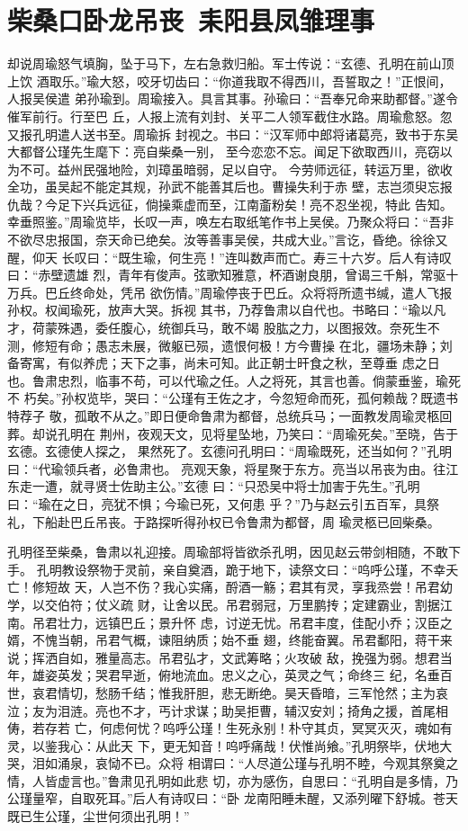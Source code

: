 \chapter{柴桑口卧龙吊丧~耒阳县凤雏理事}

却说周瑜怒气填胸，坠于马下，左右急救归船。军士传说：“玄德、孔明在前山顶上饮
酒取乐。”瑜大怒，咬牙切齿曰：“你道我取不得西川，吾誓取之！”正恨间，人报吴侯遣
弟孙瑜到。周瑜接入。具言其事。孙瑜曰：“吾奉兄命来助都督。”遂令催军前行。行至巴
丘，人报上流有刘封、关平二人领军截住水路。周瑜愈怒。忽又报孔明遣人送书至。周瑜拆
封视之。书曰：“汉军师中郎将诸葛亮，致书于东吴大都督公瑾先生麾下：亮自柴桑一别，
至今恋恋不忘。闻足下欲取西川，亮窃以为不可。益州民强地险，刘璋虽暗弱，足以自守。
今劳师远征，转运万里，欲收全功，虽吴起不能定其规，孙武不能善其后也。曹操失利于赤
壁，志岂须臾忘报仇哉？今足下兴兵远征，倘操乘虚而至，江南齑粉矣！亮不忍坐视，特此
告知。幸垂照鉴。”周瑜览毕，长叹一声，唤左右取纸笔作书上吴侯。乃聚众将曰：“吾非
不欲尽忠报国，奈天命已绝矣。汝等善事吴侯，共成大业。”言讫，昏绝。徐徐又醒，仰天
长叹曰：“既生瑜，何生亮！”连叫数声而亡。寿三十六岁。后人有诗叹曰：“赤壁遗雄
烈，青年有俊声。弦歌知雅意，杯酒谢良朋，曾谒三千斛，常驱十万兵。巴丘终命处，凭吊
欲伤情。”周瑜停丧于巴丘。众将将所遗书缄，遣人飞报孙权。权闻瑜死，放声大哭。拆视
其书，乃荐鲁肃以自代也。书略曰：“瑜以凡才，荷蒙殊遇，委任腹心，统御兵马，敢不竭
股肱之力，以图报效。奈死生不测，修短有命；愚志未展，微躯已殒，遗恨何极！方今曹操
在北，疆场未静；刘备寄寓，有似养虎；天下之事，尚未可知。此正朝士旰食之秋，至尊垂
虑之日也。鲁肃忠烈，临事不苟，可以代瑜之任。人之将死，其言也善。倘蒙垂鉴，瑜死不
朽矣。”孙权览毕，哭曰：“公瑾有王佐之才，今忽短命而死，孤何赖哉？既遗书特荐子
敬，孤敢不从之。”即日便命鲁肃为都督，总统兵马；一面教发周瑜灵柩回葬。却说孔明在
荆州，夜观天文，见将星坠地，乃笑曰：“周瑜死矣。”至晓，告于玄德。玄德使人探之，
果然死了。玄德问孔明曰：“周瑜既死，还当如何？”孔明曰：“代瑜领兵者，必鲁肃也。
亮观天象，将星聚于东方。亮当以吊丧为由。往江东走一遭，就寻贤士佐助主公。”玄德
曰：“只恐吴中将士加害于先生。”孔明曰：“瑜在之日，亮犹不惧；今瑜已死，又何患
乎？”乃与赵云引五百军，具祭礼，下船赴巴丘吊丧。于路探听得孙权已令鲁肃为都督，周
瑜灵柩已回柴桑。

孔明径至柴桑，鲁肃以礼迎接。周瑜部将皆欲杀孔明，因见赵云带剑相随，不敢下手。
孔明教设祭物于灵前，亲自奠酒，跪于地下，读祭文曰：“呜呼公瑾，不幸夭亡！修短故
天，人岂不伤？我心实痛，酹酒一觞；君其有灵，享我烝尝！吊君幼学，以交伯符；仗义疏
财，让舍以民。吊君弱冠，万里鹏抟；定建霸业，割据江南。吊君壮力，远镇巴丘；景升怀
虑，讨逆无忧。吊君丰度，佳配小乔；汉臣之婿，不愧当朝，吊君气概，谏阻纳质；始不垂
翅，终能奋翼。吊君鄱阳，蒋干来说；挥洒自如，雅量高志。吊君弘才，文武筹略；火攻破
敌，挽强为弱。想君当年，雄姿英发；哭君早逝，俯地流血。忠义之心，英灵之气；命终三
纪，名垂百世，哀君情切，愁肠千结；惟我肝胆，悲无断绝。昊天昏暗，三军怆然；主为哀
泣；友为泪涟。亮也不才，丐计求谋；助吴拒曹，辅汉安刘；掎角之援，首尾相俦，若存若
亡，何虑何忧？呜呼公瑾！生死永别！朴守其贞，冥冥灭灭，魂如有灵，以鉴我心：从此天
下，更无知音！呜呼痛哉！伏惟尚飨。”孔明祭毕，伏地大哭，泪如涌泉，哀恸不已。众将
相谓曰：“人尽道公瑾与孔明不睦，今观其祭奠之情，人皆虚言也。”鲁肃见孔明如此悲
切，亦为感伤，自思曰：“孔明自是多情，乃公瑾量窄，自取死耳。”后人有诗叹曰：“卧
龙南阳睡未醒，又添列曜下舒城。苍天既已生公瑾，尘世何须出孔明！”

